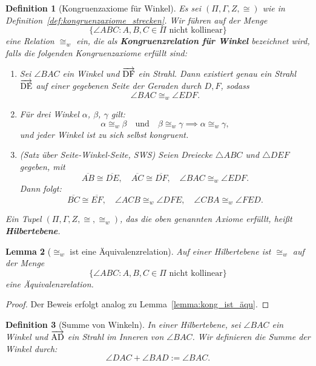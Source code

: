 \documentclass[a4paper,12pt]{article}
\theoremstyle{break}
\newtheorem{definition}{Definition}[section]
\newtheorem{lemma}[definition]{Lemma}
\begin{document}
\begin{definition}[Kongruenzaxiome für Winkel]
\label{def:kongruenzaxiome_winkel}
Es sei \((\Pi, \Gamma, Z, \cong)\) wie in Definition~\ref{def:kongruenzaxiome_strecken}. Wir führen auf der Menge 
\[
\{\angle ABC : A, B, C \in \Pi \text{ nicht kollinear}\}
\]
eine Relation \(\cong_w\) ein, die als \textbf{Kongruenzrelation für Winkel} bezeichnet wird, falls die folgenden Kongruenzaxiome erfüllt sind:
\begin{enumerate}
    \item[\textbf{(K4)}]
    Sei \(\angle BAC\) ein Winkel und \(\overrightarrow{\rm DF}\) ein Strahl. Dann existiert genau ein Strahl \(\overrightarrow{\rm DE}\) auf einer gegebenen Seite der Geraden durch \(D, F\), sodass 
    \[
    \angle BAC \cong_w \angle EDF.
    \]
    \item[\textbf{(K5)}]
    Für drei Winkel \(\alpha\), \(\beta\), \(\gamma\) gilt:
    \[
    \alpha \cong_w \beta \quad \text{und} \quad \beta \cong_w \gamma \implies \alpha \cong_w \gamma,
    \]
    und jeder Winkel ist zu sich selbst kongruent.
    \item[\textbf{(K6)}]
    (Satz über Seite-Winkel-Seite, SWS) Seien Dreiecke \(\triangle ABC\) und \(\triangle DEF\) gegeben, mit
    \[
    \overline{AB} \cong \overline{DE}, \quad \overline{AC} \cong \overline{DF}, \quad \angle BAC \cong_w \angle EDF.
    \]
    Dann folgt:
    \[
    \overline{BC} \cong \overline{EF}, \quad \angle ACB \cong_w \angle DFE, \quad \angle CBA \cong_w \angle FED.
    \]
\end{enumerate}
Ein Tupel \((\Pi, \Gamma, Z, \cong, \cong_w)\), das die oben genannten Axiome erfüllt, heißt \textbf{Hilbertebene}.
\end{definition}

\begin{lemma}[\(\cong_w\) ist eine Äquivalenzrelation]
\label{lemma:konw_aequivalenz}
Auf einer Hilbertebene ist \(\cong_w\) auf der Menge 
\[
\{\angle ABC : A, B, C \in \Pi \text{ nicht kollinear}\}
\]
eine Äquivalenzrelation.
\end{lemma}

\begin{proof}
Der Beweis erfolgt analog zu Lemma~\ref{lemma:kong_ist_äqu}.
\end{proof}

\begin{definition}[Summe von Winkeln]
\label{def:summe_winkel}
In einer Hilbertebene, sei \(\angle BAC\) ein Winkel und \(\overrightarrow{\rm AD}\) ein Strahl im Inneren von \(\angle BAC\). Wir definieren die Summe der Winkel durch:
\[
\angle DAC + \angle BAD := \angle BAC.
\]
\end{definition}
\end{document}
